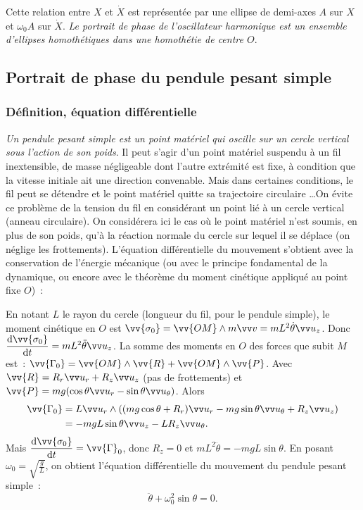 Cette relation entre \(X\) et \(\dot{X}\) est représentée par une ellipse de 
demi-axes \(A\) sur \(X\) et \(\omega_0A\) sur \(\dot{X}\). \emph{Le portrait 
de phase de l'oscillateur harmonique est un ensemble d'ellipses homothétiques 
dans une homothétie de centre \(O\)}.
%
\subsection{Portrait de phase du pendule pesant simple}%
\label{chap5-subsec:portraitdephasepesantsimple}%
%
\subsubsection{Définition, équation différentielle}%
%
\emph{Un pendule pesant simple est un point matériel qui oscille sur un cercle 
vertical sous l'action de son poids}. Il peut s'agir d'un point matériel 
suspendu à un fil inextensible, de masse négligeable dont l'autre extrémité est 
fixe, à condition que la vitesse initiale ait une direction convenable. Mais 
dans certaines conditions, le fil peut se détendre et le point matériel quitte 
sa trajectoire circulaire \ldots On évite ce problème de la tension du fil en 
considérant un point lié à un cercle vertical (anneau circulaire). On 
considérera ici le cas où le point matériel n'est soumis, en plus de son poids, 
qu'à la réaction normale du cercle sur lequel il se déplace (on néglige les 
frottements). L'équation différentielle du mouvement s'obtient avec la 
conservation de l'énergie mécanique (ou avec le principe fondamental de la 
dynamique, ou encore avec le théorème du moment cinétique appliqué au point 
fixe \(O\))~:%

En notant \(L\) le rayon du cercle (longueur du fil, pour le pendule simple), 
le moment cinétique en \(O\) est \(\vv{\sigma_0} = \vv{OM}\wedge m \vvv = 
mL^2\dot{\theta}\uz\). Donc 
\(\derived{\vv{\sigma_0}}{t}=mL^2\ddot{\theta}\uz\). La somme des moments en 
\(O\) des forces que subit \(M\) est~: 
\(\vv{\Gamma_0}=\vv{OM}\wedge\vv{R}+\vv{OM}\wedge\vv{P}\). Avec \(\vv{R} = R_r 
\ur +R_z \uz\) (pas de frottements) et \(\vv{P}=mg(\cos\theta \ur -\sin\theta 
\utheta)\). Alors
\begin{align}%
  \vv{\Gamma_0} &= L \ur \wedge \left( (mg\cos\theta +R_r)\ur - 
  mg\sin\theta\utheta +R_z\uz\right) \\
  & = -mgL\sin\theta\uz - LR_z\utheta.
\end{align}%
Mais \(\derived{\vv{\sigma_0}}{t} = \vv{\Gamma}_0\), donc \(R_z=0\) et 
\(mL^2\ddot{\theta}=-mgL\sin\theta\). En posant \(\omega_0 = 
\sqrt{\frac{g}{L}}\), on obtient l'équation différentielle du mouvement du 
pendule pesant simple~:
\begin{equation}%
  \ddot{\theta} + \omega_0^2\sin\theta =0.
\end{equation}%
%
